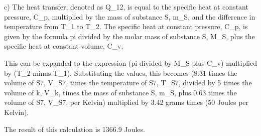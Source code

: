 c) The heat transfer, denoted as Q_12, is equal to the specific heat at constant pressure, C_p, multiplied by the mass of substance S, m_S, and the difference in temperature from T_1 to T_2. The specific heat at constant pressure, C_p, is given by the formula pi divided by the molar mass of substance S, M_S, plus the specific heat at constant volume, C_v.

This can be expanded to the expression (pi divided by M_S plus C_v) multiplied by (T_2 minus T_1). Substituting the values, this becomes (8.31 times the volume of S7, V_S7, times the temperature of S7, T_S7, divided by 5 times the volume of k, V_k, times the mass of substance S, m_S, plus 0.63 times the volume of S7, V_S7, per Kelvin) multiplied by 3.42 grams times (50 Joules per Kelvin).

The result of this calculation is 1366.9 Joules.